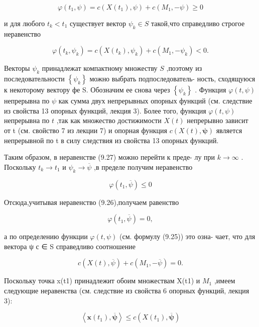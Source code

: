 \documentclass[8pt]{extarticle}
\begin{document}
\[
\varphi \left( {{t}_{1},\psi }\right)  = c\left( {X\left( {t}_{1}\right) ,\psi }\right)  + c\left( {{M}_{1}, - \psi }\right)  \geq  0 \tag{9.26}
\]

и для любого \({t}_{k} < {t}_{1}\) существует вектор \({\psi }_{k} \in  S\) такой,что справедливо строгое неравенство

\[
\varphi \left( {{t}_{k},{\psi }_{k}}\right)  = c\left( {X\left( {t}_{k}\right) ,{\psi }_{k}}\right)  + c\left( {{M}_{1}, - {\psi }_{k}}\right)  < 0. \tag{9.27}
\]

Векторы \({\psi }_{k}\) принадлежат компактному множеству \(S\) ,поэтому из последовательности \(\left\{  {\psi }_{k}\right\}\) можно выбрать подпоследователь- ность, сходящуюся к некоторому вектору фе S. Обозначим ее снова через \(\left\{  {\psi }_{k}\right\}\) . Функция \(\varphi \left( {t,\psi }\right)\) непрерывна по \(\psi\) как сумма двух непрерывных опорных функций (см. следствие из свойства 13 опорных функций, лекция 3). Более того, функция \(\varphi \left( {t,\psi }\right)\) непрерывна по \(t\) ,так как множество достижимости \(X\left( t\right)\) непрерывно зависит от t (см. свойство 7 из лекции 7) и опорная функция \(c\left( {X\left( t\right) ,\mathbf{\psi }}\right)\) является непрерывной по t в силу следствия из свойства 13 опорных функций.

Таким образом, в неравенстве (9.27) можно перейти к преде- лу при \(k \rightarrow  \infty\) . Поскольку \({t}_{k} \rightarrow  {t}_{1}\) и \({\psi }_{k} \rightarrow  \overline{\psi }\) ,в пределе получим неравенство

\[
\varphi \left( {{t}_{1},\overline{\psi }}\right)  \leq  0
\]

Отсюда,учитывая неравенство (9.26),получаем равенство

\[
\varphi \left( {{t}_{1},\overline{\psi }}\right)  = 0,
\]

а по определению функции \(\varphi \left( {t,\psi }\right)\) (см. формулу (9.25)) это озна- чает, что для вектора ψ с ∈ S справедливо соотношение

\[
c\left( {X\left( t\right) ,\overline{\psi }}\right)  + c\left( {{M}_{1}, - \overline{\psi }}\right)  = 0. \tag{9.28}
\]

Поскольку точка x(t1) принадлежит обоим множествам X(t1) и \({M}_{1}\) ,имеем следующие неравенства (см. следствие из свойства 6 опорных функций, лекция 3):

\[
\left\langle  {\mathbf{x}\left( {t}_{1}\right) ,\overline{\mathbf{\psi }}}\right\rangle   \leq  c\left( {X\left( {t}_{1}\right) ,\overline{\mathbf{\psi }}}\right)
\]
\end{document}
